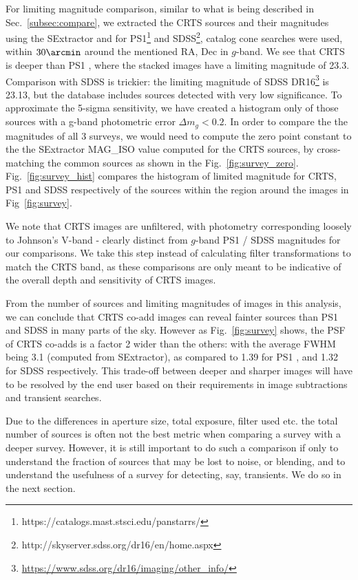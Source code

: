 \documentclass[fleqn,usenatbib]{mnras}
\begin{document}
For limiting magnitude comparison, similar to what is being described in Sec.~\ref{subsec:compare}, we extracted the CRTS sources and their magnitudes using the SExtractor and for PS1\footnote{{https://catalogs.mast.stsci.edu/panstarrs/}} and SDSS\footnote{{http://skyserver.sdss.org/dr16/en/home.aspx}}, catalog cone searches were used, within $30\arcmin$ around the mentioned RA, Dec 
in $g$-band.  
We see that CRTS is deeper than PS1 \cite{chambers2016pan}, where the stacked images have a limiting magnitude of 23.3. Comparison with SDSS \cite{lundgren2015sdss} is trickier: the limiting magnitude of SDSS DR16\footnote{\url{https://www.sdss.org/dr16/imaging/other_info/}} is 23.13, but the database includes sources detected with very low significance. To approximate the 5-sigma sensitivity, we have created a histogram only of those sources with a g-band photometric error $\Delta m_g < 0.2$.  In order to compare the the magnitudes of all 3 surveys, we would need to compute the zero point constant to the the SExtractor MAG\_ISO value computed for the CRTS sources, by cross-matching the common sources as shown in the Fig.~\ref{fig:survey_zero}. Fig.~\ref{fig:survey_hist} compares the histogram of limited magnitude for CRTS, PS1 and SDSS respectively of the sources within the region around the images in Fig~\ref{fig:survey}. 



We note that CRTS images are unfiltered, with photometry corresponding loosely to Johnson's V-band - clearly distinct from $g$-band PS1 / SDSS magnitudes for our comparisons. We take this step instead of calculating filter transformations to match the CRTS band, as these comparisons are only meant to be indicative of the overall depth and sensitivity of CRTS images. 


From the number of sources and limiting magnitudes of images in this analysis, we can conclude that CRTS co-add images can reveal fainter sources than PS1 and SDSS in many parts of the sky. However as Fig.~\ref{fig:survey} shows, the PSF of CRTS co-adds is a factor 2 wider than the others: with the average FWHM being 3\arcsec.1 (computed from SExtractor), as compared to  1\arcsec.39 for PS1 \citep{magnier2016pan}, and 1\arcsec.32 for SDSS \citep{ross2011ameliorating} respectively. This trade-off between deeper and sharper images will have to be resolved by the end user based on their requirements in image subtractions and transient searches.


Due to the differences in aperture size, total exposure, filter used etc. the total number of sources is often not the best metric when comparing a survey with a deeper survey. However, it is still important to do such a comparison if only to understand the fraction of sources that may be lost to noise, or blending, and to understand the usefulness of a survey for detecting, say, transients. We do so in the next section.
\end{document}
